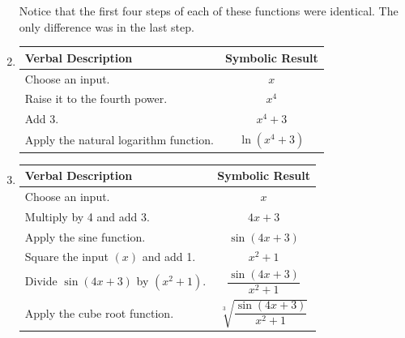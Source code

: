 \documentclass[11pt]{article}
\begin{document}
\begin{enumerate}
\eighth
Notice that the first four steps of each of these functions were identical.  The only difference was in the last step.

\item
\begin{tabular}[t]{| l | c|} \hline
\textbf{Verbal Description}  &  \textbf{Symbolic Result}  \\ \hline
Choose an input.	  &  $x$           \\  \hline
Raise it to the fourth power.	  &  $x^4$          \\  \hline
Add 3.	        &  $x^4 + 3$      \\  \hline
Apply the natural logarithm function.  &  $\ln \left( x^4 + 3 \right)$\\ \hline
\end{tabular}


\item
\begin{tabular}[t]{| l | c|} \hline
\textbf{Verbal Description}  &  \textbf{Symbolic Result}  \\ \hline
Choose an input.	  &  $x$           \\  \hline
Multiply by 4 and add 3.	  &  $4x + 3$          \\  \hline
Apply the sine function.          & $ \sin (4x + 3)$ \\ \hline
Square the input $(x)$ and add 1.	        &  $x^2 + 1$      \\  \hline
Divide $\sin(4x + 3)$ by $\left( x^2 + 1 \right)$.  &  $\dfrac{\sin(4x + 3)}{x^2 + 1} $\\ \hline
Apply the cube root function.   &  $\sqrt[3]{\dfrac{\sin(4x + 3)}{x^2 + 1}} $ \\ \hline
\end{tabular}

\end{enumerate}
\end{document}
